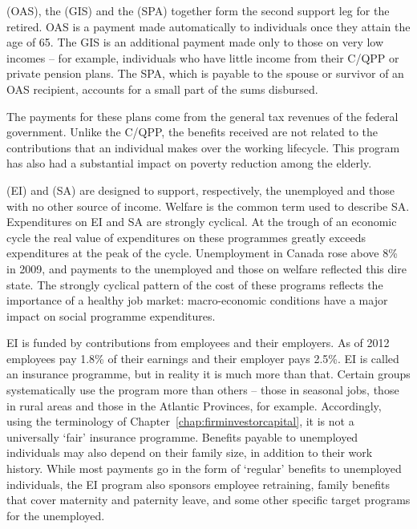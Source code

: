  (OAS), the  (GIS) and the  (SPA) together form the second support leg for the retired. OAS is a payment made automatically to individuals once they attain the age of 65. The GIS is an additional payment made only to those on very low incomes -- for example, individuals who have little income from their C/QPP or private pension plans. The SPA, which is payable to the spouse or survivor of an OAS recipient, accounts for a small part of the sums disbursed.

The payments for these plans come from the general tax revenues of the federal government. Unlike the C/QPP, the benefits received are not related to the contributions that an individual makes over the working lifecycle. This program has also had a substantial impact on poverty reduction among the elderly.

 (EI) and  (SA) are designed to support, respectively, the unemployed and those with no other source of income. Welfare is the common term used to describe SA. Expenditures on EI and SA are strongly cyclical.  At the trough of an economic cycle the real value of expenditures on these programmes greatly exceeds expenditures at the peak of the cycle. Unemployment in Canada rose above 8\% in 2009, and payments to the unemployed and those on welfare reflected this dire state. The strongly cyclical pattern of the cost of these programs reflects the importance of a healthy job market: macro-economic conditions have a major impact on social programme expenditures. 

EI is funded by contributions from employees and their employers. As of 2012 employees pay 1.8\% of their earnings and their employer pays 2.5\%. EI is called an insurance programme, but in reality it is much more than that. Certain groups systematically use the program more than others -- those in seasonal jobs, those in rural areas and those in the Atlantic Provinces, for example. Accordingly, using the terminology of Chapter~\ref{chap:firminvestorcapital}, it is not a universally `fair' insurance programme. Benefits payable to unemployed individuals may also depend on their family size, in addition to their work history. While most payments go in the form of `regular' benefits to unemployed individuals, the EI program also sponsors employee retraining, family benefits that cover maternity and paternity leave, and some other specific target programs for the unemployed. 

